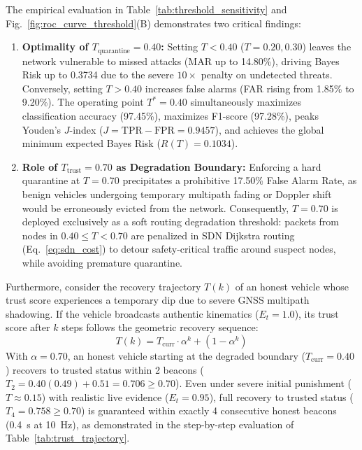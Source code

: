 \documentclass[conference]{IEEEtran}
\begin{document}
The empirical evaluation in Table~\ref{tab:threshold_sensitivity} and Fig.~\ref{fig:roc_curve_threshold}(B) demonstrates two critical findings:
\begin{enumerate}
    \item \textbf{Optimality of $T_{\text{quarantine}} = 0.40$:} Setting $T < 0.40$ ($T=0.20, 0.30$) leaves the network vulnerable to missed attacks (MAR up to 14.80\%), driving Bayes Risk up to 0.3734 due to the severe $10\times$ penalty on undetected threats. Conversely, setting $T > 0.40$ increases false alarms (FAR rising from 1.85\% to 9.20\%). The operating point $T^* = 0.40$ simultaneously maximizes classification accuracy (97.45\%), maximizes F1-score (97.28\%), peaks Youden's $J$-index ($J = \text{TPR} - \text{FPR} = 0.9457$), and achieves the global minimum expected Bayes Risk ($R(T) = 0.1034$).
    \item \textbf{Role of $T_{\text{trust}} = 0.70$ as Degradation Boundary:} Enforcing a hard quarantine at $T = 0.70$ precipitates a prohibitive 17.50\% False Alarm Rate, as benign vehicles undergoing temporary multipath fading or Doppler shift would be erroneously evicted from the network. Consequently, $T = 0.70$ is deployed exclusively as a soft routing degradation threshold: packets from nodes in $0.40 \le T < 0.70$ are penalized in SDN Dijkstra routing (Eq.~\ref{eq:sdn_cost}) to detour safety-critical traffic around suspect nodes, while avoiding premature quarantine.
\end{enumerate}

Furthermore, consider the recovery trajectory $T(k)$ of an honest vehicle whose trust score experiences a temporary dip due to severe GNSS multipath shadowing. If the vehicle broadcasts authentic kinematics ($E_t = 1.0$), its trust score after $k$ steps follows the geometric recovery sequence:
\begin{equation}
T(k) = T_{\text{curr}} \cdot \alpha^k + (1 - \alpha^k)
\label{eq:recovery}
\end{equation}
With $\alpha = 0.70$, an honest vehicle starting at the degraded boundary ($T_{\text{curr}} = 0.40$) recovers to trusted status within 2 beacons ($T_2 = 0.40(0.49) + 0.51 = 0.706 \ge 0.70$). Even under severe initial punishment ($T \approx 0.15$) with realistic live evidence ($E_t = 0.95$), full recovery to trusted status ($T_4 = 0.758 \ge 0.70$) is guaranteed within exactly 4 consecutive honest beacons (0.4~s at 10~Hz), as demonstrated in the step-by-step evaluation of Table~\ref{tab:trust_trajectory}.
\end{document}
